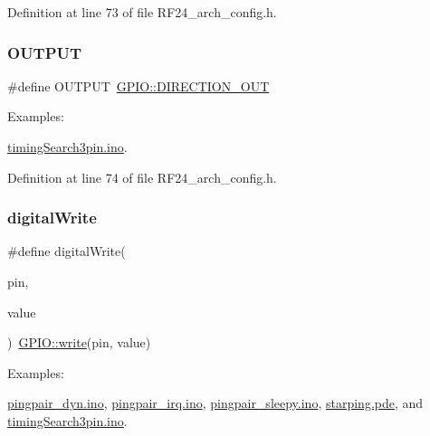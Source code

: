 Definition at line 73 of file R\+F24\+\_\+arch\+\_\+config.\+h.

\mbox{\label{group__Porting__General_ga61a3c9a18380aafb6e430e79bf596557}} 
\subsubsection{\texorpdfstring{O\+U\+T\+P\+UT}{OUTPUT}}
{\footnotesize\ttfamily \#define O\+U\+T\+P\+UT~\hyperlink{group__Porting__GPIO_gac39c2a3ce71b0df667c227292d4ab30c}{G\+P\+I\+O\+::\+D\+I\+R\+E\+C\+T\+I\+O\+N\+\_\+\+O\+UT}}

\begin{Desc}
\item[Examples\+: ]\par
\hyperlink{timingSearch3pin_8ino-example}{timing\+Search3pin.\+ino}.\end{Desc}


Definition at line 74 of file R\+F24\+\_\+arch\+\_\+config.\+h.

\mbox{\label{group__Porting__General_gabda89b115581947337690b2f85bfab6e}} 
\subsubsection{\texorpdfstring{digital\+Write}{digitalWrite}}
{\footnotesize\ttfamily \#define digital\+Write(\begin{DoxyParamCaption}\item[{}]{pin,  }\item[{}]{value }\end{DoxyParamCaption})~\hyperlink{group__Porting__GPIO_ga957694ca061e30268dd8a4b28a08e59b}{G\+P\+I\+O\+::write}(pin, value)}

\begin{Desc}
\item[Examples\+: ]\par
\hyperlink{pingpair_dyn_8ino-example}{pingpair\+\_\+dyn.\+ino}, \hyperlink{pingpair_irq_8ino-example}{pingpair\+\_\+irq.\+ino}, \hyperlink{pingpair_sleepy_8ino-example}{pingpair\+\_\+sleepy.\+ino}, \hyperlink{starping_8pde-example}{starping.\+pde}, and \hyperlink{timingSearch3pin_8ino-example}{timing\+Search3pin.\+ino}.\end{Desc}


